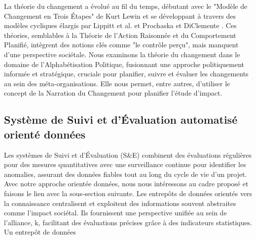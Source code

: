 La théorie du changement a évolué au fil du temps, débutant avec le "Modèle de Changement en Trois Étapes" de Kurt Lewin \cite{lewin_frontiers_1947} et se développant à travers des modèles cycliques élargis par Lippitt et al. \cite{lippitt_dynamics_1958} et Prochaska et DiClemente \cite{prochaska_stages_1983}. Ces théories, semblables à la Théorie de l’Action Raisonnée et du Comportement Planifié, intègrent des notions clés comme "le contrôle perçu", mais manquent d'une perspective sociétale. Nous examinons la théorie du changement dans le domaine de l'Alphabétisation Politique, fusionnant une approche politiquement informée et stratégique, cruciale pour planifier, suivre et évaluer les changements au sein des méta-organisations. Elle nous permet, entre autres, d'utiliser le concept de la Narration du Changement pour planifier l'étude d'impact.

\subsection{Système de Suivi et d'Évaluation automatisé orienté données}
Les systèmes de Suivi et d'Évaluation (S\&E) combinent des évaluations régulières pour des mesures quantitatives avec une surveillance continue pour identifier les anomalies, assurant des données fiables tout au long du cycle de vie d'un projet. Avec notre approche orientée données, nous nous intéressons au cadre proposé et faisons le lien avec la sous-section suivante.
Les entrepôts de données orientés vers la connaissance centralisent et exploitent des informations souvent abstraites comme l'impact sociétal. Ils fournissent une perspective unifiée au sein de l'alliance, k, facilitant des évaluations précises grâce à des indicateurs statistiques. Un entrepôt de données 